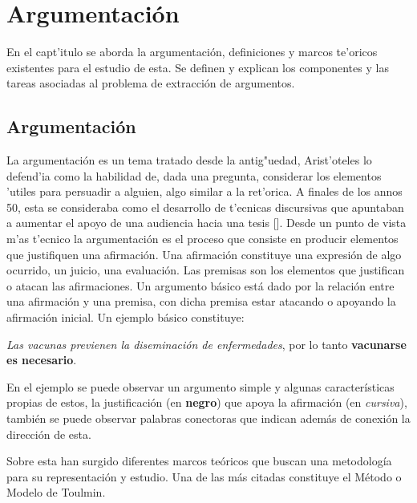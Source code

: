\chapter{Argumentación}\label{chapter:argumentation}


En el capt'itulo se aborda la argumentación, definiciones y marcos te'oricos existentes para el estudio de esta.
Se definen y explican los componentes y las tareas asociadas al problema de extracción de argumentos.  

\section{Argumentación}


La argumentación es un tema tratado desde la antig"uedad, Arist'oteles lo defend'ia como la 
habilidad de, dada una pregunta, considerar los elementos 'utiles para persuadir a alguien, algo
similar a la ret'orica. A finales de los annos 50, esta se consideraba como el desarrollo de t'ecnicas 
discursivas que apuntaban a aumentar el apoyo de una audiencia hacia una tesis [\cite{janier2019argument}]. 
Desde un punto de vista m'as t'ecnico la argumentación es el proceso que consiste en producir elementos que 
justifiquen una afirmación. Una afirmación constituye una expresión de algo ocurrido, un juicio, una evaluación. 
Las premisas son los elementos que justifican o atacan las afirmaciones. Un argumento básico está dado por 
la relación entre una afirmación y una premisa, con dicha premisa estar atacando o apoyando la afirmación 
inicial. Un ejemplo básico constituye:

\begin{adjustwidth}{25pt}{25pt}
    \emph{Las vacunas previenen la diseminación de enfermedades}, por lo tanto \textbf{vacunarse es necesario}.
\end{adjustwidth}

En el ejemplo se puede observar un argumento simple y algunas características propias de estos, la justificación 
(en \textbf{negro}) que apoya la afirmación (en \emph{cursiva}), también se puede observar palabras conectoras 
que indican además de conexión la dirección de esta.

Sobre esta han surgido diferentes marcos teóricos que buscan una metodología para su representación y estudio. 
Una de las más citadas constituye el Método o Modelo de Toulmin.

